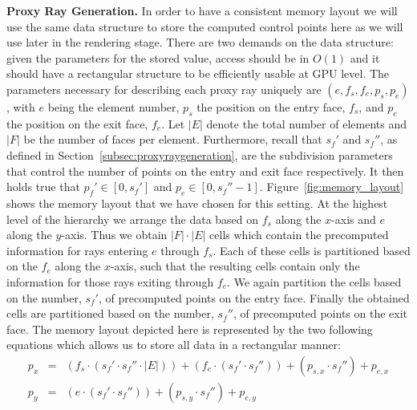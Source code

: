 \documentclass[journal]{vgtc}                %
\begin{document}
\noindent \textbf{Proxy Ray Generation.} In order to have a consistent memory layout we will use the same data structure to store the computed control points here as we will use  later in the rendering stage. There are two demands on the data structure: given the parameters for the stored value, access should be in $O(1)$ and it should have a rectangular structure to be efficiently usable at GPU level. The parameters necessary for describing each proxy ray uniquely are $(e, f_s, f_e, p_s, p_e)$, with $e $ being the element number, $p_s$ the position on the entry face, $f_s$, and $p_e$ the position on the exit face, $f_e$. Let $\left|E\right|$ denote the total number of elements and $\left|F\right|$ be the number of faces per element. Furthermore, recall that $s_f'$ and $s_f''$, as defined in Section~\ref{subsec:proxyraygeneration}, are the subdivision parameters that control the number of points on the entry and exit face respectively. It then holds true that $p_f' \in [0,s_f']$ and $p_e \in [0,s_f'' - 1]$. Figure~\ref{fig:memory_layout} shows the memory layout that we have chosen for this setting. At the highest level of the hierarchy we arrange the data based on $f_s$ along the $x$-axis and $e$ along the $y$-axis. Thus we obtain $\left|F\right| \cdot \left|E\right|$ cells which contain the precomputed information for rays entering $e$ through $f_s$. Each of these cells is partitioned based on the $f_e$ along the $x$-axis, such that the resulting cells contain only the information for those rays exiting through $f_e$. We again partition the cells based on the number, $s_f'$, of precomputed points on the entry face. Finally the obtained cells are partitioned based on the number, $s_f''$, of precomputed points on the exit face. The memory layout depicted here is represented by the two following equations which allows us to store all data in a rectangular manner: 
\begin{eqnarray}
p_x &=& (f_s \cdot (s_f' \cdot s_f'' \cdot \left|E\right|)) +(f_e \cdot (s_f' \cdot s_f'')) + (p_{s,x} \cdot s_f'') + p_{e,x}\\
p_y &=& (e   \cdot (s_f' \cdot s_f'')) + (p_{s,y} \cdot s_f'') + p_{e,y}
\end{eqnarray}
\end{document}
